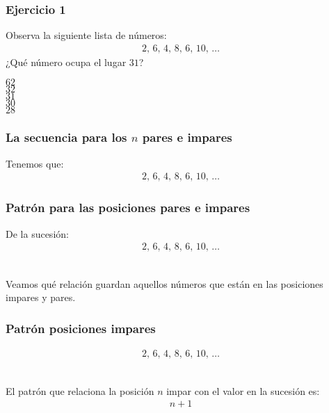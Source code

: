 \begin{frame}
\frametitle{Ejercicio 1}
Observa la siguiente lista de números:
\begin{align*}
2, \, 6, \, 4, \, 8, \, 6, \, 10, \, \ldots
\end{align*}
¿Qué número ocupa el lugar $31$?
\begin{choices}
\choice $62$ \\
\choice $32$ \\
\choice $31$ \\
\choice $30$ \\
\choice $28$
\end{choices}
\pause
{}
\end{frame}
\begin{frame}
\frametitle{La secuencia para los $n$ pares e impares}
Tenemos que:
\begin{align*}
2, \, 6, \, 4, \, 8, \, 6, \, 10, \, \ldots
\end{align*}
\end{frame}
\begin{frame}
\frametitle{Patrón para las posiciones pares e impares}
De la sucesión:
\begin{align*}
2, \, 6, \, 4, \, 8, \, 6, \, 10, \, \ldots
\end{align*}
\\
\bigskip
\pause
Veamos qué relación guardan aquellos números que están en las posiciones impares y pares.
\end{frame}
\begin{frame}
\frametitle{Patrón posiciones impares}
\begin{align*}
2, \, 6, \, 4, \, 8, \, 6, \, 10, \, \ldots
\end{align*}
\\
\bigskip
\pause
El patrón que relaciona la posición $n$ impar con el valor en la sucesión es:
\pause
\begin{align*}
n + 1
\end{align*}
\end{frame}
